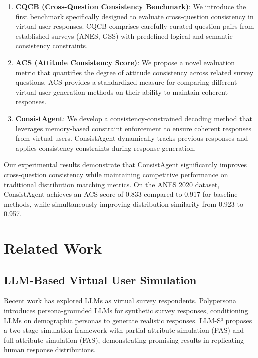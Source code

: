 \documentclass[sigconf, anonymous]{acmart}
\begin{document}
\begin{enumerate}
    \item \textbf{CQCB (Cross-Question Consistency Benchmark)}: We introduce the first benchmark specifically designed to evaluate cross-question consistency in virtual user responses. CQCB comprises carefully curated question pairs from established surveys (ANES, GSS) with predefined logical and semantic consistency constraints.
    
    \item \textbf{ACS (Attitude Consistency Score)}: We propose a novel evaluation metric that quantifies the degree of attitude consistency across related survey questions. ACS provides a standardized measure for comparing different virtual user generation methods on their ability to maintain coherent responses.
    
    \item \textbf{ConsistAgent}: We develop a consistency-constrained decoding method that leverages memory-based constraint enforcement to ensure coherent responses from virtual users. ConsistAgent dynamically tracks previous responses and applies consistency constraints during response generation.
\end{enumerate}

Our experimental results demonstrate that ConsistAgent significantly improves cross-question consistency while maintaining competitive performance on traditional distribution matching metrics. On the ANES 2020 dataset, ConsistAgent achieves an ACS score of 0.833 compared to 0.917 for baseline methods, while simultaneously improving distribution similarity from 0.923 to 0.957.

\section{Related Work}

\subsection{LLM-Based Virtual User Simulation}

Recent work has explored LLMs as virtual survey respondents. Polypersona introduces persona-grounded LLMs for synthetic survey responses, conditioning LLMs on demographic personas to generate realistic responses. LLM-S³ proposes a two-stage simulation framework with partial attribute simulation (PAS) and full attribute simulation (FAS), demonstrating promising results in replicating human response distributions.
\end{document}
